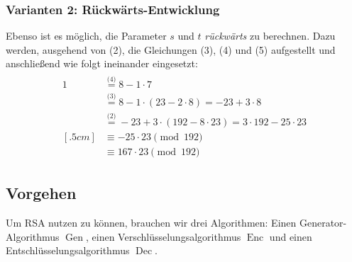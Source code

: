\begin{beispiel}[EEA]
  \subsubsection*{Varianten 2: Rückwärts-Entwicklung} 
  Ebenso ist es möglich, die Parameter $s$ und $t$ \emph{rückwärts} zu
  berechnen. Dazu werden, ausgehend von (2), die Gleichungen (3), (4) und
  (5) aufgestellt und anschließend wie folgt ineinander eingesetzt:
  \begin{align*}
    \begin{split}
      1 &\stackrel{\textit{(4)}}{=} 8 - 1 \cdot 7\\
        &\stackrel{\textit{(3)}}{=} 8 - 1 \cdot (23 - 2 \cdot 8) = -23 + 3 \cdot 8\\ 
        &\stackrel{\textit{(2)}}{=} -23 + 3 \cdot (192 - 8 \cdot 23) = 3\cdot 192 - 25 \cdot 23\\
 [.5cm] &\equiv -25 \cdot 23 \pmod{192}\\
        &\equiv 167 \cdot 23 \pmod{192}
    \end{split}
  \end{align*}
\end{beispiel}

\subsection{Vorgehen}
\label{ch:asymmenc:rsa:vorgehen} Um RSA \indexRSATextBook nutzen zu
können, brauchen wir drei Algorithmen: Einen Generator-Algorithmus
$\operatorname{Gen}$, einen Verschlüsselungsalgorithmus
$\operatorname{Enc}$ und einen Entschlüsselungsalgorithmus
$\operatorname{Dec}$.
